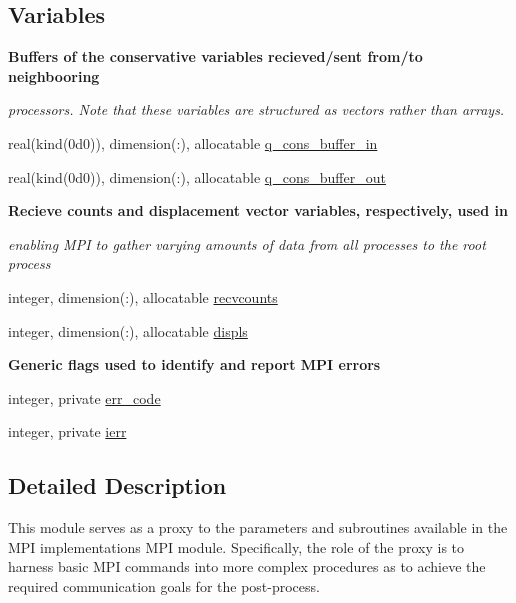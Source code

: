 \subsection*{Variables}
\begin{Indent}\textbf{ Buffers of the conservative variables recieved/sent from/to neighbooring}\par
{\em processors. Note that these variables are structured as vectors rather than arrays. }\begin{DoxyCompactItemize}
\item 
real(kind(0d0)), dimension(\+:), allocatable \hyperlink{namespacem__mpi__proxy_af08f3246d9efac15d6391dc4205d4611}{q\+\_\+cons\+\_\+buffer\+\_\+in}
\item 
real(kind(0d0)), dimension(\+:), allocatable \hyperlink{namespacem__mpi__proxy_a3d449655a88a9e5248af35a82caf877a}{q\+\_\+cons\+\_\+buffer\+\_\+out}
\end{DoxyCompactItemize}
\end{Indent}
\begin{Indent}\textbf{ Recieve counts and displacement vector variables, respectively, used in}\par
{\em enabling M\+PI to gather varying amounts of data from all processes to the root process }\begin{DoxyCompactItemize}
\item 
integer, dimension(\+:), allocatable \hyperlink{namespacem__mpi__proxy_a2198e825f0884d4ee9e96b6efdb69cee}{recvcounts}
\item 
integer, dimension(\+:), allocatable \hyperlink{namespacem__mpi__proxy_aebaa6e3cc66d2431c5fb49896d40d7e6}{displs}
\end{DoxyCompactItemize}
\end{Indent}
\begin{Indent}\textbf{ Generic flags used to identify and report M\+PI errors}\par
\begin{DoxyCompactItemize}
\item 
integer, private \hyperlink{namespacem__mpi__proxy_ae5709407e3600d19d79b183e409bb982}{err\+\_\+code}
\item 
integer, private \hyperlink{namespacem__mpi__proxy_a306ba163b09cfc692125f2c0ba82ef8c}{ierr}
\end{DoxyCompactItemize}
\end{Indent}


\subsection{Detailed Description}
This module serves as a proxy to the parameters and subroutines available in the M\+PI implementation\textquotesingle{}s M\+PI module. Specifically, the role of the proxy is to harness basic M\+PI commands into more complex procedures as to achieve the required communication goals for the post-\/process. 


